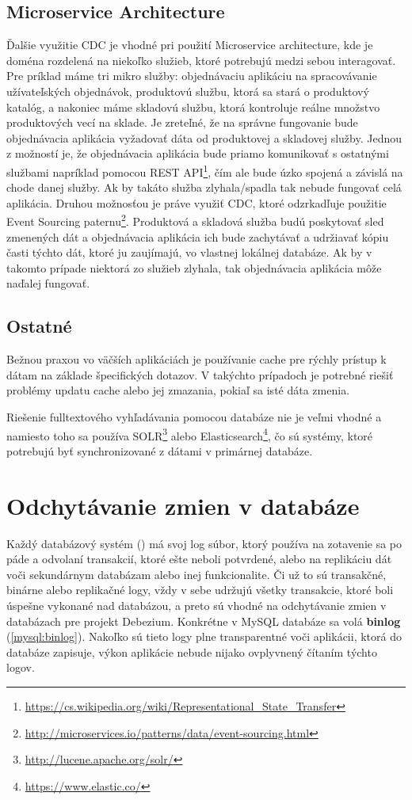 \subsection{Microservice Architecture}
Ďalšie využitie CDC je vhodné pri použití Microservice architecture, kde je doména rozdelená na niekoľko služieb, ktoré potrebujú medzi sebou interagovať. Pre príklad máme tri mikro služby: objednávaciu aplikáciu na spracovávanie užívateľských objednávok, produktovú službu, ktorá sa stará o produktový katalóg, a nakoniec máme skladovú službu, ktorá kontroluje reálne množstvo produktových vecí na sklade. Je zreteľné, že na správne fungovanie bude objednávacia aplikácia vyžadovať dáta od produktovej a skladovej služby. Jednou z možností je, že objednávacia aplikácia bude priamo komunikovať s ostatnými službami napríklad pomocou REST API\footnote{\url{https://cs.wikipedia.org/wiki/Representational_State_Transfer}}, čím ale bude úzko spojená a závislá na chode danej služby. Ak by takáto služba zlyhala/spadla tak nebude fungovať celá aplikácia. Druhou možnosťou je práve využiť CDC, ktoré odzrkadľuje použitie Event Sourcing paternu\footnote{\url{http://microservices.io/patterns/data/event-sourcing.html}}. Produktová a skladová služba budú poskytovať sled zmenených dát a objednávacia aplikácia ich bude zachytávať a udržiavať kópiu časti týchto dát, ktoré ju zaujímajú, vo vlastnej lokálnej databáze. Ak by v takomto prípade niektorá zo služieb zlyhala, tak objednávacia aplikácia môže naďalej fungovať.

\subsection{Ostatné}
Bežnou praxou vo väčších aplikáciách je používanie cache pre rýchly prístup k dátam na základe špecifických dotazov. V takýchto prípadoch je potrebné riešiť problémy updatu cache alebo jej zmazania, pokiaľ sa isté dáta zmenia.

Riešenie fulltextového vyhľadávania pomocou databáze nie je veľmi vhodné a namiesto toho sa používa SOLR\footnote{\url{http://lucene.apache.org/solr/}} alebo Elasticsearch\footnote{\url{https://www.elastic.co/}}, čo sú systémy, ktoré potrebujú byť synchronizované z dátami v primárnej databáze. 


\section{Odchytávanie zmien v databáze}
Každý databázový systém () má svoj log súbor, ktorý používa na zotavenie sa po páde a odvolaní transakcií, ktoré ešte neboli potvrdené, alebo na replikáciu dát voči sekundárnym databázam alebo inej funkcionalite. Či už to sú transakčné, binárne alebo replikačné logy, vždy v sebe udržujú všetky transakcie, ktoré boli úspešne vykonané nad databázou, a preto sú vhodné na odchytávanie zmien v databázach pre projekt Debezium. Konkrétne v MySQL databáze sa volá \textbf{binlog} (\ref{mysql:binlog}). Nakoľko sú tieto logy plne transparentné voči aplikácii, ktorá do databáze zapisuje, výkon aplikácie nebude nijako ovplyvnený čítaním týchto logov.

